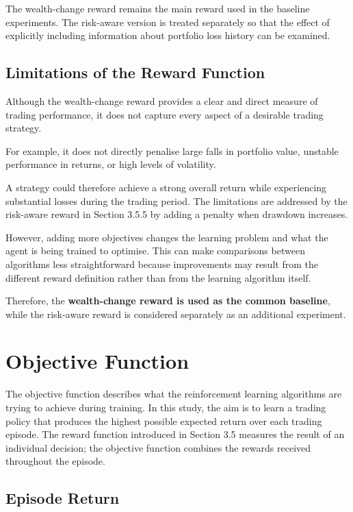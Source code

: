 The wealth-change reward remains the main reward used in the baseline
experiments. The risk-aware version is treated separately so that the
effect of explicitly including information about portfolio loss history
can be examined.

\subsection{Limitations of the Reward Function}

Although the wealth-change reward provides a clear and direct measure of
trading performance, it does not capture every aspect of a desirable
trading strategy.

For example, it does not directly penalise large falls in portfolio
value, unstable performance in returns, or high levels of volatility.

A strategy could therefore achieve a strong overall return while
experiencing substantial losses during the trading period. The
limitations are addressed by the risk-aware reward in Section 3.5.5 by
adding a penalty when drawdown increases.

However, adding more objectives changes the learning problem and what
the agent is being trained to optimise. This can make comparisons
between algorithms less straightforward because improvements may result
from the different reward definition rather than from the learning
algorithm itself.

Therefore, the \textbf{wealth-change reward is used as the common
baseline}, while the risk-aware reward is considered separately as an
additional experiment.

\section{Objective Function}

The objective function describes what the reinforcement learning
algorithms are trying to achieve during training. In this study, the aim
is to learn a trading policy that produces the highest possible expected
return over each trading episode. The reward function introduced in
Section 3.5 measures the result of an individual decision; the objective
function combines the rewards received throughout the episode.

\subsection{Episode Return}

